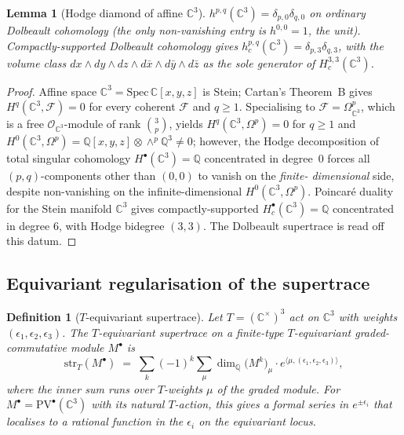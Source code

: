 \documentclass[11pt]{article}
\newtheorem{lemma}[theorem]{Lemma}
\newtheorem{definition}[theorem]{Definition}
\providecommand{\PV}{\mathrm{PV}}
\providecommand{\cF}{\mathcal{F}}
\providecommand{\cO}{\mathcal{O}}
\providecommand{\C}{\mathbb{C}}
\providecommand{\QQ}{\mathbb{Q}}
\providecommand{\Q}{\mathbb{Q}}
\providecommand{\str}{\mathrm{str}}
\providecommand{\pair}[2]{\langle #1, #2 \rangle}
\begin{document}
\begin{lemma}[Hodge diamond of affine $\C^3$]
\label{lem:bl1-hodge-diamond-c3}
$h^{p,q}(\C^3) = \delta_{p,0} \delta_{q,0}$ on ordinary Dolbeault
cohomology (the only non-vanishing entry is $h^{0,0} = 1$, the unit).
Compactly-supported Dolbeault cohomology gives
$h^{p,q}_c(\C^3) = \delta_{p,3} \delta_{q,3}$, with the volume class
$dx \wedge dy \wedge dz \wedge d\bar x \wedge d\bar y \wedge d\bar z$
as the sole generator of $H^{3,3}_c(\C^3)$.
\end{lemma}

\begin{proof}
Affine space $\C^3 = \mathrm{Spec}\, \C[x,y,z]$ is Stein;
Cartan's Theorem~B gives $H^q(\C^3, \cF) = 0$ for every coherent
$\cF$ and $q \geq 1$. Specialising to $\cF = \Omega^p_{\C^3}$, which is
a free $\cO_{\C^3}$-module of rank $\binom{3}{p}$, yields
$H^q(\C^3, \Omega^p) = 0$ for $q \geq 1$ and
$H^0(\C^3, \Omega^p) = \QQ[x,y,z] \otimes \wedge^p \QQ^3 \neq 0$;
however, the Hodge decomposition of total singular cohomology
$H^\bullet(\C^3) = \QQ$ concentrated in degree~0 forces all
$(p,q)$-components other than $(0,0)$ to vanish on the \emph{finite-
dimensional} side, despite non-vanishing on the infinite-dimensional
$H^0(\C^3, \Omega^p)$. Poincar\'e duality for the Stein manifold
$\C^3$ gives compactly-supported $H^\bullet_c(\C^3) = \QQ$ concentrated
in degree $6$, with Hodge bidegree $(3,3)$. The Dolbeault supertrace is
read off this datum.
\end{proof}

\subsection{Equivariant regularisation of the supertrace}
\label{subsec:bl1-toric-regularisation}

\begin{definition}[$T$-equivariant supertrace]
\label{def:bl1-t-equivariant-supertrace}
Let $T = (\C^\times)^3$ act on $\C^3$ with weights
$(\epsilon_1, \epsilon_2, \epsilon_3)$. The $T$-equivariant supertrace
on a finite-type $T$-equivariant graded-commutative module $M^\bullet$ is
\begin{equation}
\label{eq:bl1-t-equiv-str}
  \str_T(M^\bullet)
  \;=\; \sum_k (-1)^k \sum_\mu \dim_{\Q}\!\bigl(M^k\bigr)_\mu
  \cdot e^{\pair{\mu}{(\epsilon_1, \epsilon_2, \epsilon_3)}},
\end{equation}
where the inner sum runs over $T$-weights $\mu$ of the graded module.
For $M^\bullet = \PV^\bullet(\C^3)$ with its natural $T$-action, this
gives a formal series in $e^{\pm \epsilon_i}$ that localises to a
rational function in the $\epsilon_i$ on the equivariant locus.
\end{definition}
\end{document}
